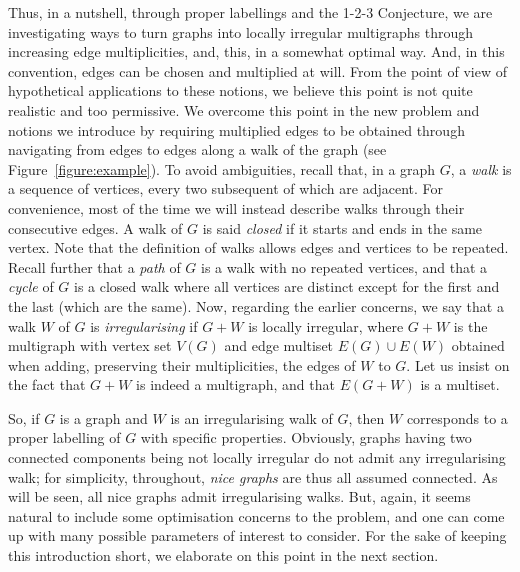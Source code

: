 \documentclass[a4paper,11pt,dvipsnames]{elsarticle}
\newcommand{\sam}[1]{\todo[size=\tiny,color=red!20!white]{\textbf{Sam:} #1}}
\newcommand{\sam}[1]{}
\begin{document}
Thus, in a nutshell, through proper labellings and the 1-2-3 Conjecture, 
we are investigating ways to turn graphs into locally irregular multigraphs through increasing edge multiplicities,
and, this, in a somewhat optimal way.
And, in this convention, edges can be chosen and multiplied at will. 
From the point of view of hypothetical applications to these notions,
we believe this point is not quite realistic and too permissive.
We overcome this point in the new problem and notions we introduce by requiring multiplied edges to be obtained 
through navigating from edges to edges along a walk of the graph (see Figure~\ref{figure:example}).
To avoid ambiguities, recall that, in a graph $G$, a \textit{walk} is a sequence of vertices, every two subsequent of which are adjacent. For convenience, most of the time we will instead describe walks through their consecutive edges.
A walk of $G$ is said \textit{closed} if it starts and ends in the same vertex.
Note that the definition of walks allows edges and vertices to be repeated.
Recall further that a \textit{path} of $G$ is a walk with no repeated vertices, and that a \textit{cycle} of $G$ is a closed walk where all vertices are distinct except for the first and the last (which are the same). 
Now, regarding the earlier concerns, we say that a walk $W$ of $G$ is \textit{irregularising} if $G+W$ is locally irregular, where $G+W$ is the multigraph with vertex set $V(G)$ and edge multiset $E(G) \cup E(W)$ obtained when adding, preserving their multiplicities, the edges of $W$ to $G$. Let us insist on the fact that $G+W$ is indeed a multigraph, and that $E(G+W)$ is a multiset.

So, if $G$ is a graph and $W$ is an irregularising walk of $G$,
then $W$ corresponds to a proper labelling of $G$ with specific properties.
Obviously, graphs having two connected components being not locally irregular do not admit any irregularising walk; for simplicity, throughout, \textit{nice graphs} are thus all assumed connected.
As will be seen, all nice
graphs admit irregularising walks.
But, again, it seems natural to include some optimisation concerns to the problem,
and one can come up with many possible parameters of interest to consider.
For the sake of keeping this introduction short,
we elaborate on this point in the next section.
\medskip
\end{document}
